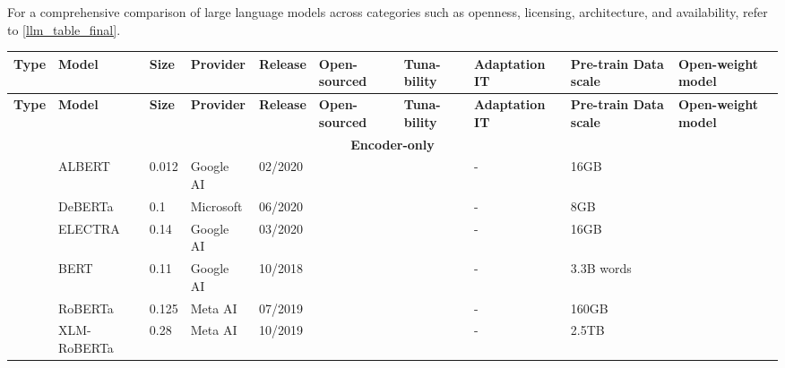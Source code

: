 For a comprehensive comparison of large language models across categories such as openness, licensing, architecture, and availability, refer to \ref{llm_table_final}.
\newpage
\begin{landscape}
	\scriptsize
	\begin{longtable}{|l|l|l|l|l|l|l|l|l|l|}
		\hline
		\textbf{Type} & \textbf{Model} & \textbf{Size} & \textbf{Provider} & \textbf{Release} & \textbf{Open-\newline sourced} & \textbf{Tuna-\newline bility} & \textbf{Adaptation IT} & \textbf{Pre-train \newline Data scale} & \textbf{Open-weight \newline model} \\
		\hline
		\endfirsthead
		
		\hline
		\textbf{Type} & \textbf{Model} & \textbf{Size} & \textbf{Provider} & \textbf{Release} & \textbf{Open-\newline sourced} & \textbf{Tuna-\newline bility} & \textbf{Adaptation IT} & \textbf{Pre-train \newline Data scale} & \textbf{Open-weight \newline model} \\
		\hline
		\endhead
		
		\multicolumn{10}{|c|}{\textbf{Encoder-only}} \\
		\hline
		& ALBERT & 0.012 & Google AI & 02/2020 & \xmark & \cmark & - & 16GB & \cmark \\
		& DeBERTa & 0.1 & Microsoft & 06/2020 & \cmark & \cmark & - & 8GB & \cmark \\
		& ELECTRA & 0.14 & Google AI & 03/2020 & \cmark & \cmark & - & 16GB & \cmark \\
		& BERT & 0.11 & Google AI & 10/2018 & \cmark & \cmark & - & 3.3B words & \cmark \\
		& RoBERTa & 0.125 & Meta AI & 07/2019 & \cmark & \cmark & - & 160GB & \cmark \\
		& XLM-RoBERTa & 0.28 & Meta AI & 10/2019 & \cmark & \cmark & - & 2.5TB & \cmark \\
		\hline
		

\end{longtable}
\end{landscape}
